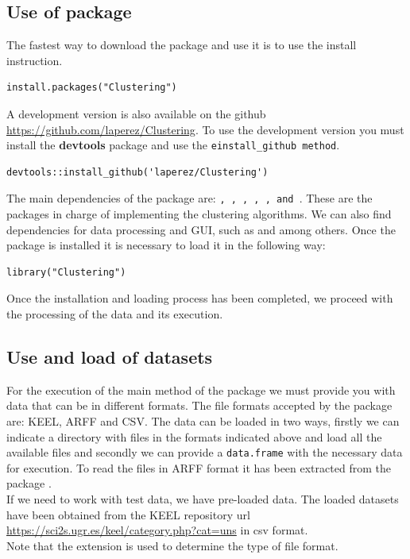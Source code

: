 \subsection{Use of  package}

The fastest way to download the  package and use it is to use the install instruction.

\begin{verbatim}
install.packages("Clustering")
\end{verbatim}

A development version is also available on the github \url{https://github.com/laperez/Clustering}. To use the development version you must install the \textbf{devtools} package and use the \texttt{einstall\_github method}.

\begin{verbatim}
devtools::install_github('laperez/Clustering')
\end{verbatim}

The main dependencies of the   package are: \texttt{, , , , ,  and }. These are the packages in charge of implementing the clustering algorithms. We can also find dependencies for data processing and GUI, such as \texttt{} and \texttt{} among others. Once the package is installed it is necessary to load it in the following way:

\begin{verbatim}
library("Clustering")
\end{verbatim}

Once the installation and loading process has been completed, we proceed with the processing of the data and its execution.

\subsection*{Use and load of datasets}

For the execution of the main method of the package we must provide you with data that can be in different formats. The file formats accepted by the package are: KEEL, ARFF and CSV. The data can be loaded in two ways, firstly we can indicate a directory with files in the formats indicated above and load all the available files and secondly we can provide a \texttt{data.frame} with the necessary data for execution. To read the files in ARFF format it has been extracted from the  package \citep{b55}.\\
If we need to work with test data, we have pre-loaded data. The loaded datasets have been obtained from the KEEL repository url \url{https://sci2s.ugr.es/keel/category.php?cat=uns} in csv format.\\
Note that the extension is used to determine the type of file format.

